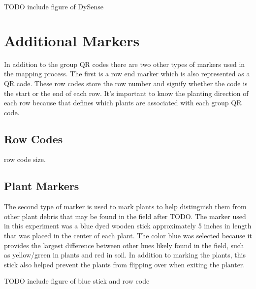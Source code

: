 TODO include figure of DySense

\section{Additional Markers}
\label{system-markers}

In addition to the group QR codes there are two other types of markers used in the mapping process.  The first is a row end marker which is also represented as a QR code.  These row codes store the row number and signify whether the code is the start or the end of each row.  It's important to know the planting direction of each row because that defines which plants are associated with each group QR code.   

\subsection{Row Codes}

row code size.

\subsection{Plant Markers}

The second type of marker is used to mark plants to help distinguish them from other plant debris that may be found in the field after TODO.  The marker used in this experiment was a blue dyed wooden stick approximately 5 inches in length that was placed in the center of each plant. The color blue was selected because it provides the largest difference between other hues likely found in the field, such as yellow/green in plants and red in soil.  In addition to marking the plants, this stick also helped prevent the plants from flipping over when exiting the planter.

TODO include figure of blue stick and row code
